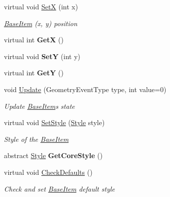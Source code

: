 \begin{DoxyCompactItemize}
virtual void \mbox{\hyperlink{class_space_v_i_l_1_1_base_item_a6ad3ba5bf9637b193d78b22ee2867434}{SetX}} (int x)
\begin{DoxyCompactList}\small\item\em \mbox{\hyperlink{class_space_v_i_l_1_1_base_item}{Base\+Item}} (x, y) position \end{DoxyCompactList}\item 
\mbox{\label{class_space_v_i_l_1_1_base_item_a378aa87e287eba0cc17b79274dfda93c}} 
virtual int {\bfseries GetX} ()
\item 
\mbox{\label{class_space_v_i_l_1_1_base_item_afa40218ded67e9cc7dff5153a3f48c30}} 
virtual void {\bfseries SetY} (int y)
\item 
\mbox{\label{class_space_v_i_l_1_1_base_item_adf2a77b3346736f7622203b0ae6ae312}} 
virtual int {\bfseries GetY} ()
\item 
void \mbox{\hyperlink{class_space_v_i_l_1_1_base_item_aec3ac6bb0e7d814b478d89b93f8e3d18}{Update}} (Geometry\+Event\+Type type, int value=0)
\begin{DoxyCompactList}\small\item\em Update \mbox{\hyperlink{class_space_v_i_l_1_1_base_item}{Base\+Item}}\textquotesingle{}s state \end{DoxyCompactList}\item 
virtual void \mbox{\hyperlink{class_space_v_i_l_1_1_base_item_a74dec9854f0a7553ad3b50f140bfe07d}{Set\+Style}} (\mbox{\hyperlink{class_space_v_i_l_1_1_decorations_1_1_style}{Style}} style)
\begin{DoxyCompactList}\small\item\em Style of the \mbox{\hyperlink{class_space_v_i_l_1_1_base_item}{Base\+Item}} \end{DoxyCompactList}\item 
\mbox{\label{class_space_v_i_l_1_1_base_item_a89861094e3f3ebf91cdadce421f21e79}} 
abstract \mbox{\hyperlink{class_space_v_i_l_1_1_decorations_1_1_style}{Style}} {\bfseries Get\+Core\+Style} ()
\item 
virtual void \mbox{\hyperlink{class_space_v_i_l_1_1_base_item_a66974390b46c82f1a4c4d54c141559d5}{Check\+Defaults}} ()
\begin{DoxyCompactList}\small\item\em Check and set \mbox{\hyperlink{class_space_v_i_l_1_1_base_item}{Base\+Item}} default style \end{DoxyCompactList}\item 

\end{DoxyCompactItemize}

